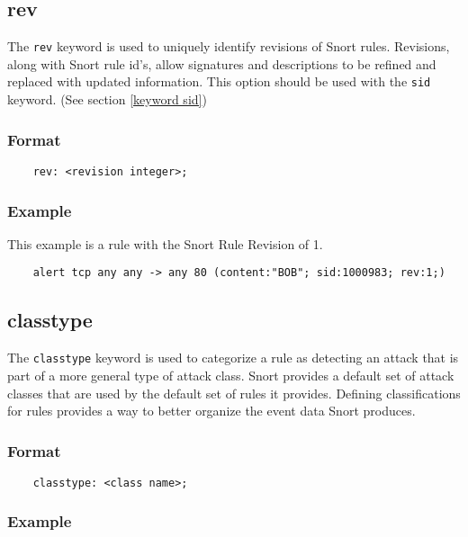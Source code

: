 \documentclass[english]{report}
\begin{document}
\subsection{rev}
\label{keyword rev}

The \texttt{rev} keyword is used to uniquely identify revisions of Snort rules.
Revisions, along with Snort rule id's, allow signatures and descriptions to be
refined and replaced with updated information.  This option should be used with
the \texttt{sid} keyword.  (See section \ref{keyword sid})

\subsubsection{Format}

\begin{verbatim}
    rev: <revision integer>;
\end{verbatim}

\subsubsection{Example}

This example is a rule with the Snort Rule Revision of 1.

\begin{verbatim}
    alert tcp any any -> any 80 (content:"BOB"; sid:1000983; rev:1;)
\end{verbatim}

\subsection{classtype}

The \texttt{classtype} keyword is used to categorize a rule as detecting an
attack that is part of a more general type of attack class. Snort provides a
default set of attack classes that are used by the default set of rules it
provides. Defining classifications for rules provides a way to better organize
the event data Snort produces.

\subsubsection{Format}

\begin{verbatim}
    classtype: <class name>;
\end{verbatim}

\subsubsection{Example}
\end{document}
